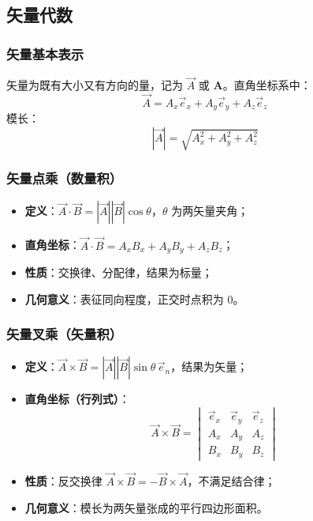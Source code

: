 \subsection{矢量代数}
\subsubsection{矢量基本表示}
矢量为既有大小又有方向的量，记为 $\vec{A}$ 或 $\boldsymbol{A}$。直角坐标系中：
\[
\vec{A} = A_x \vec{e}_x + A_y \vec{e}_y + A_z \vec{e}_z
\]
模长：
\[
|\vec{A}| = \sqrt{A_x^2 + A_y^2 + A_z^2}
\]

\subsubsection{矢量点乘（数量积）}
\begin{itemize}
    \item \textbf{定义}：$\vec{A} \cdot \vec{B} = |\vec{A}||\vec{B}|\cos\theta$，$\theta$ 为两矢量夹角；
    \item \textbf{直角坐标}：$\vec{A} \cdot \vec{B} = A_xB_x + A_yB_y + A_zB_z$；
    \item \textbf{性质}：交换律、分配律，结果为标量；
    \item \textbf{几何意义}：表征同向程度，正交时点积为 $0$。
\end{itemize}

\subsubsection{矢量叉乘（矢量积）}
\begin{itemize}
    \item \textbf{定义}：$\vec{A} \times \vec{B} = |\vec{A}||\vec{B}|\sin\theta \, \vec{e}_n$，结果为矢量；
    \item \textbf{直角坐标（行列式）}：
    \[
    \vec{A} \times \vec{B} = \begin{vmatrix}
    \vec{e}_x & \vec{e}_y & \vec{e}_z \\
    A_x & A_y & A_z \\
    B_x & B_y & B_z
    \end{vmatrix}
    \]
    \item \textbf{性质}：反交换律 $\vec{A} \times \vec{B} = -\vec{B} \times \vec{A}$，不满足结合律；
    \item \textbf{几何意义}：模长为两矢量张成的平行四边形面积。
\end{itemize}

